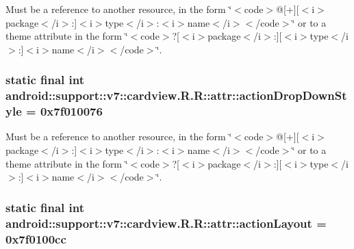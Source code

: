Must be a reference to another resource, in the form \char`\"{}$<$code$>$@\mbox{[}+\mbox{]}\mbox{[}$<$i$>$package$<$/i$>$:\mbox{]}$<$i$>$type$<$/i$>$:$<$i$>$name$<$/i$>$$<$/code$>$\char`\"{} or to a theme attribute in the form \char`\"{}$<$code$>$?\mbox{[}$<$i$>$package$<$/i$>$:\mbox{]}\mbox{[}$<$i$>$type$<$/i$>$:\mbox{]}$<$i$>$name$<$/i$>$$<$/code$>$\char`\"{}. \hypertarget{classandroid_1_1support_1_1v7_1_1cardview_1_1_r_1_1attr_5e204fb122b80f7be1b1dfdfc0fe8d4d}{
\subsubsection[{actionDropDownStyle}]{\setlength{\rightskip}{0pt plus 5cm}static final int android::support::v7::cardview.R.R::attr::actionDropDownStyle = 0x7f010076}}
\label{classandroid_1_1support_1_1v7_1_1cardview_1_1_r_1_1attr_5e204fb122b80f7be1b1dfdfc0fe8d4d}


Must be a reference to another resource, in the form \char`\"{}$<$code$>$@\mbox{[}+\mbox{]}\mbox{[}$<$i$>$package$<$/i$>$:\mbox{]}$<$i$>$type$<$/i$>$:$<$i$>$name$<$/i$>$$<$/code$>$\char`\"{} or to a theme attribute in the form \char`\"{}$<$code$>$?\mbox{[}$<$i$>$package$<$/i$>$:\mbox{]}\mbox{[}$<$i$>$type$<$/i$>$:\mbox{]}$<$i$>$name$<$/i$>$$<$/code$>$\char`\"{}. \hypertarget{classandroid_1_1support_1_1v7_1_1cardview_1_1_r_1_1attr_fd76e2399916fa1a77eb4fa4de5d062d}{
\subsubsection[{actionLayout}]{\setlength{\rightskip}{0pt plus 5cm}static final int android::support::v7::cardview.R.R::attr::actionLayout = 0x7f0100cc}}
\label{classandroid_1_1support_1_1v7_1_1cardview_1_1_r_1_1attr_fd76e2399916fa1a77eb4fa4de5d062d}


